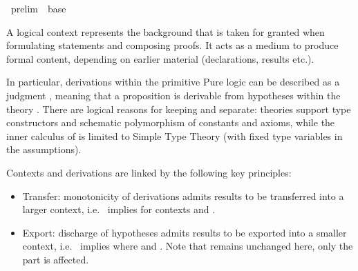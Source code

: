 %
\begin{isabellebody}%
\def\isabellecontext{prelim}%
%
\isadelimtheory
\isanewline
\isanewline
\isanewline
%
\endisadelimtheory
%
\isatagtheory
{}\isamarkupfalse%
\ prelim\ \ base\ %
\endisatagtheory
{\isafoldtheory}%
%
\isadelimtheory
%
\endisadelimtheory
%
\isamarkuptrue%
%
\isamarkuptrue%
%
\begin{isamarkuptext}%
A logical context represents the background that is taken for
  granted when formulating statements and composing proofs.  It acts
  as a medium to produce formal content, depending on earlier material
  (declarations, results etc.).

  In particular, derivations within the primitive Pure logic can be
  described as a judgment \isa{{\isasymGamma}\ {\isasymturnstile}\isactrlsub {\isasymTheta}\ {\isasymphi}}, meaning that a
  proposition \isa{{\isasymphi}} is derivable from hypotheses \isa{{\isasymGamma}}
  within the theory \isa{{\isasymTheta}}.  There are logical reasons for
  keeping \isa{{\isasymTheta}} and \isa{{\isasymGamma}} separate: theories support type
  constructors and schematic polymorphism of constants and axioms,
  while the inner calculus of \isa{{\isasymGamma}\ {\isasymturnstile}\ {\isasymphi}} is limited to Simple
  Type Theory (with fixed type variables in the assumptions).

  \medskip Contexts and derivations are linked by the following key
  principles:

  \begin{itemize}

  \item Transfer: monotonicity of derivations admits results to be
  transferred into a larger context, i.e.\ \isa{{\isasymGamma}\ {\isasymturnstile}\isactrlsub {\isasymTheta}\ {\isasymphi}}
  implies \isa{{\isasymGamma}{\isacharprime}\ {\isasymturnstile}\isactrlsub {\isasymTheta}\isactrlsub {\isacharprime}\ {\isasymphi}} for contexts \isa{{\isasymTheta}{\isacharprime}\ {\isasymsupseteq}\ {\isasymTheta}} and \isa{{\isasymGamma}{\isacharprime}\ {\isasymsupseteq}\ {\isasymGamma}}.

  \item Export: discharge of hypotheses admits results to be exported
  into a smaller context, i.e.\ \isa{{\isasymGamma}{\isacharprime}\ {\isasymturnstile}\isactrlsub {\isasymTheta}\ {\isasymphi}} implies
  \isa{{\isasymGamma}\ {\isasymturnstile}\isactrlsub {\isasymTheta}\ {\isasymDelta}\ {\isasymLongrightarrow}\ {\isasymphi}} where \isa{{\isasymGamma}{\isacharprime}\ {\isasymsupseteq}\ {\isasymGamma}} and \isa{{\isasymDelta}\ {\isacharequal}\ {\isasymGamma}{\isacharprime}\ {\isacharminus}\ {\isasymGamma}}.  Note that \isa{{\isasymTheta}} remains unchanged here, only the
  \isa{{\isasymGamma}} part is affected.


\end{itemize}
\end{isamarkuptext}
\end{isabellebody}
